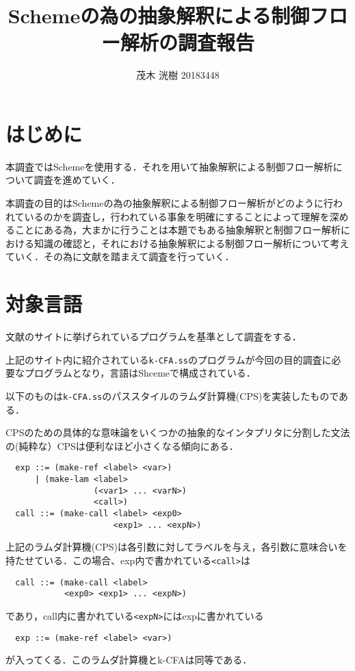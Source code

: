 \documentclass[twocolumn]{jsarticle}
\title{\textbf{Schemeの為の抽象解釈による制御フロー解析の調査報告}}
\author{茂木 洸樹 20183448}
\date{} %
\begin{document}
\maketitle
\thispagestyle{fancy}


\section{はじめに}
本調査ではSchemeを使用する．それを用いて抽象解釈による制御フロー解析について調査を進めていく．

本調査の目的はSchemeの為の抽象解釈による制御フロー解析がどのように行われているのかを調査し，行われている事象を明確にすることによって理解を深めることにある為，大まかに行うことは本題でもある抽象解釈と制御フロー解析における知識の確認と，それにおける抽象解釈による制御フロー解析について考えていく．その為に文献\cite{reason,reason2}を踏まえて調査を行っていく．

\section{対象言語}
文献\cite{reason2}のサイトに挙げられているプログラムを基準として調査をする．
 
 上記のサイト内に紹介されている\verb|k-CFA.ss|のプログラムが今回の目的調査に必要なプログラムとなり，言語はShcemeで構成されている．
 
 以下のものは\verb|k-CFA.ss|のパススタイルのラムダ計算機(CPS)を実装したものである．
 
 CPSのための具体的な意味論をいくつかの抽象的なインタプリタに分割した文法の(純粋な）CPSは便利なほど小さくなる傾向にある．~\cite{reason}
 
\setlength{\baselineskip}{18pt}
\begin{verbatim}
  exp ::= (make-ref <label> <var>)
      | (make-lam <label>
                  (<var1> ... <varN>)
                  <call>)
  call ::= (make-call <label> <exp0> 
                      <exp1> ... <expN>)
\end{verbatim}


上記のラムダ計算機(CPS)は各引数に対してラベルを与え，各引数に意味合いを持たせている．この場合、exp内で書かれている\verb|<call>|は
\begin{verbatim}
  call ::= (make-call <label>
            <exp0> <exp1> ... <expN>)
\end{verbatim}
であり，call内に書かれている\verb|<expN>|にはexpに書かれている
\begin{verbatim}
  exp ::= (make-ref <label> <var>)
\end{verbatim}
が入ってくる．このラムダ計算機とk-CFAは同等である．
 
\end{document}
